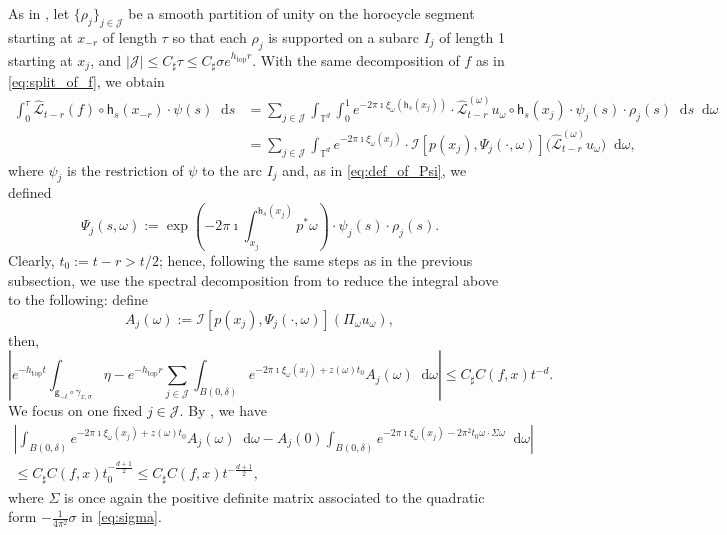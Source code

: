 \documentclass[11pt,letterpaper]{amsart}
\newcommand \cL {{\mathcal L}}
\newcommand \T {{ \mathbb T}}
\newcommand \sC {{C_\sharp}}
\newcommand{\horo}{\mathsf{h}}
\newcommand{\geo}{\mathsf{g}}
\newcommand*{\diff}{\mathop{}\!\mathrm{d}}
\DeclareMathOperator{\topp}{top}
\theoremstyle{definition}
\begin{document}
As in , let $\{\rho_j\}_{j \in \mathcal{J}}$ be a smooth partition of unity on the horocycle segment starting at $x_{-r}$ of length $\tau$ so that each $\rho_j$ is supported on a subarc $I_j$ of length 1 starting at $x_{j}$, and $|\mathcal{J}|\leq \sC\tau \leq \sC \sigma e^{h_{\topp} r}$. With the same decomposition of $f$ as in \eqref{eq:split_of_f}, we obtain
\[
\begin{split}
\int_0^{\tau} \hat{\cL}_{t-r}(f) \circ \horo_s(x_{-r}) \cdot \psi(s) \diff s &= \sum_{j \in \mathcal{J}} \int_{\T^d} \int_0^1 e^{-2\pi \imath \xi_\omega(\horo_s(x_j))} \cdot \hat{\cL}^{(\omega)}_{t-r} u_{\omega} \circ \horo_s(x_j) \cdot \psi_j(s) \cdot \rho_j(s) \diff s\diff \omega \\
&= \sum_{j \in \mathcal{J}} \int_{\T^d} e^{-2\pi \imath \xi_\omega(x_j)} \cdot \mathcal{I}[p(x_j), \Psi_j(\cdot, \omega)] \Big( \hat{\cL}^{(\omega)}_{t-r} u_{\omega}  \Big) \diff \omega,
\end{split}
\]
where $\psi_j$ is the restriction of $\psi$ to the arc $I_j$ and, as in \eqref{eq:def_of_Psi}, we defined
\[
\Psi_j(s, \omega) := \exp\left(- 2 \pi \imath \int_{x_{j}}^{\horo_s(x_{j})}p^{\ast}\omega \right)\cdot \psi_j(s)\cdot \rho_j(s).
\]
Clearly, $t_0:= t-r > t/2$; hence, following the same steps as in the previous subsection, we use the spectral decomposition from  to reduce the integral above to the following: define
\[
A_j(\omega) := \mathcal{I}[p(x_{j}),\Psi_j(\cdot, \omega)]\left(\Pi_{\omega} u_\omega \right),
\]
then,
\[
\left\lvert e^{-h_{\topp} t}\int_{\geo_{-t} \circ \gamma_{x, \sigma}} \eta - e^{-h_{\topp} r} \sum_{j \in \mathcal{J}}  \int_{B(0,\delta)} e^{- 2 \pi \imath \xi_{\omega}(x_{j}) +z(\omega) t_0 } A_j(\omega) \diff \omega  \right\rvert \leq \sC C(f,x) t^{-d}.
\]
We focus on one fixed $j \in \mathcal{J}$. 
By , we have
\begin{multline*}
	\left\lvert \int_{B(0,\delta)} e^{- 2 \pi \imath \xi_{\omega}(x_{j})+z(\omega) t_0 } A_j(\omega) \diff \omega - 
A_j(0) \int_{B(0,\delta)} e^{- 2 \pi \imath \xi_{\omega}(x_{j}) -2\pi^2 t_0 \omega \cdot \Sigma \omega }  \diff \omega \right\rvert \\ 
	\leq \sC C(f,x) t_0^{-\frac{d+1}{2}}\leq \sC C(f,x) t^{-\frac{d+1}{2}},
\end{multline*} 
where $\Sigma$ is once again the positive definite matrix associated to the quadratic form $-\frac{1}{4\pi^2}\sigma$ in \eqref{eq:sigma}.
\end{document}
